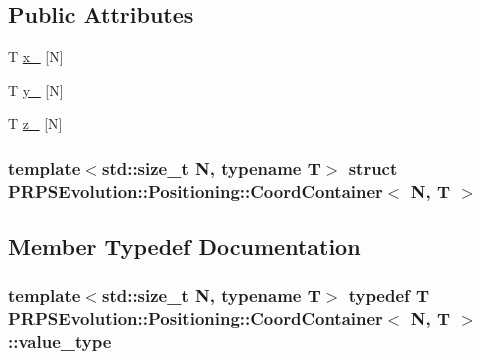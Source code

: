 \subsection*{\-Public \-Attributes}
\begin{DoxyCompactItemize}
\item 
\-T \hyperlink{struct_p_r_p_s_evolution_1_1_positioning_1_1_coord_container_ae6e996f4a81e981d860985c2f949b405}{x\-\_\-} \mbox{[}\-N\mbox{]}
\item 
\-T \hyperlink{struct_p_r_p_s_evolution_1_1_positioning_1_1_coord_container_a2918ecaef01a1b583c59584db2a32250}{y\-\_\-} \mbox{[}\-N\mbox{]}
\item 
\-T \hyperlink{struct_p_r_p_s_evolution_1_1_positioning_1_1_coord_container_aef9d7962c3ed093cd97f502ac70d254d}{z\-\_\-} \mbox{[}\-N\mbox{]}
\end{DoxyCompactItemize}
\subsubsection*{template$<$std\-::size\-\_\-t \-N, typename \-T$>$ struct P\-R\-P\-S\-Evolution\-::\-Positioning\-::\-Coord\-Container$<$ N, T $>$}



\subsection{\-Member \-Typedef \-Documentation}
\hypertarget{struct_p_r_p_s_evolution_1_1_positioning_1_1_coord_container_aa81c47e8743b6045ffd3ac7f681a3172}{
\subsubsection[{value\-\_\-type}]{\setlength{\rightskip}{0pt plus 5cm}template$<$std\-::size\-\_\-t \-N, typename \-T$>$ typedef \-T {\bf \-P\-R\-P\-S\-Evolution\-::\-Positioning\-::\-Coord\-Container}$<$ \-N, \-T $>$\-::{\bf value\-\_\-type}}}\label{struct_p_r_p_s_evolution_1_1_positioning_1_1_coord_container_aa81c47e8743b6045ffd3ac7f681a3172}


